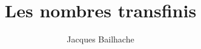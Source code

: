 \documentclass[12pt]{beamer}
\title{Les nombres transfinis}
\author{Jacques Bailhache}
\begin{document}
\begin{comment}

\begin{frame}
\frametitle{Les nombres transfinis}

L'intuition qu'on a des notions mathématiques peut être "capturée", formalisée par des théories axiomatiques ou systèmes formels, par exemple les axiomes de Peano formalisent la notion de nombre entier :

\begin{itemize}
\item L'élément appelé zéro et noté 0, est un entier naturel.
\item Tout entier naturel n a un unique successeur
\item Aucun entier naturel n'a 0 pour successeur.
\item Deux entiers naturels ayant le même successeur sont égaux.
\item Si un ensemble d'entiers naturels contient 0 et contient le successeur de chacun de ses éléments, alors cet ensemble est égal à N.
\end{itemize}

\end{frame}
\begin{frame}

\large
Le premier théorème d'incomplétude de Gödel établit qu'une théorie suffisante pour y démontrer les théorèmes de base de l'arithmétique est nécessairement incomplète, au sens où il existe des énoncés qui n'y sont ni démontrables, ni réfutables.

\end{frame}
\begin{frame}

Soit par exemple T\(_0\) l'arithmétique de Peano. Le théorème de Gödel établit qu'il existe une proposition G\(_0\) que T\(_0\) ne peut ni démontrer ni réfuter. Cette proposition peut s'interpréter (moyennant un certain codage arithmétique) comme "G\(_0\) n'est pas démontrable dans T\(_0\)" ou "Je ne suis pas démontrable dans T\(_0\)".
Si G\(_0\) est démontrable, alors elle est fausse et T\(_0\) est incorrecte.
Si G\(_0\) n'est pas démontrable, alors elle est vraie et T\(_0\) est incomplète.
G\(_0\) n'est ni démontrable ni réfutable dans T\(_0\), mais est intuitivement vraie.   

\end{frame}
\begin{frame}

On a donc une proposition G\(_0\) intuitivement vraie mais qu'on ne peut pas démontrer dans le cadre de T\(_0\).
Une idée consiste à ajouter G\(_0\) comme axiome à T\(_0\). On obtient ainsi une nouvelle théorie T\(_1\). Mais cette théorie a sa propre proposition gödelienne G\(_1\).
On peut continuer en ajoutant G\(_1\) comme axiome à T\(_1\) pour obtenir une théorie T\(_2\), et ainsi de suite.
Ensuite on peut définir une théorie T\(_\omega\) union de T\(_0\), T\(_1\), T\(_2\), ... 
Mais cette théorie a sa propre proposition gödelienne G\(_\omega\).
On peut l'ajouter comme axiome à T\(_\omega\) pour obtenir T\(_\omega+1\).


\end{comment}
\end{document}
